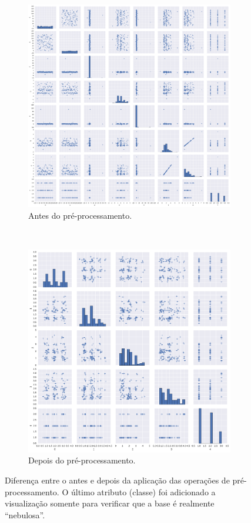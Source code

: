 \documentclass{article}
\begin{document}
\begin{figure}[h!]
	\centering
	\begin{subfigure}[t]{0.49\textwidth}
		\centering
		\includegraphics[width=\linewidth]{exercicio3-a.pdf}
		\caption{Antes do pré-processamento.}
		\label{fig:exercicio3-a}
	\end{subfigure}%
	~ 
	\begin{subfigure}[t]{0.49\textwidth}
		\centering
		\includegraphics[width=\linewidth]{exercicio3-b.pdf}
		\caption{Depois do pré-processamento.}
		\label{fig:exercicio3-b}
	\end{subfigure}
	\caption{Diferença entre o antes e depois da aplicação das operações de pré-processamento. O último atributo (classe) foi adicionado a visualização somente para verificar que a base é realmente ``nebulosa''.}
\end{figure}
\end{document}
